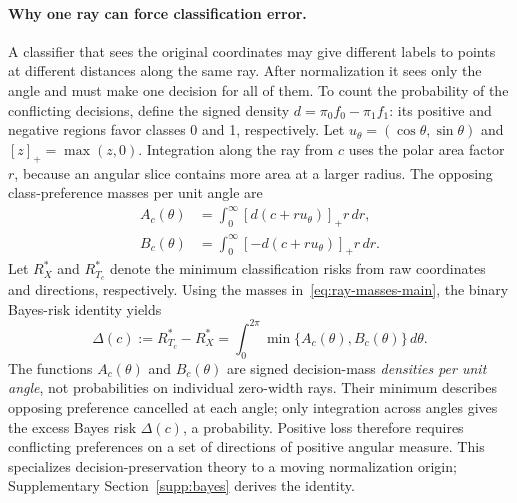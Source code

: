 \paragraph{Why one ray can force classification error.}
A classifier that sees the original coordinates may give different labels to points at different distances along the same ray. After normalization it sees only the angle and must make one decision for all of them. To count the probability of the conflicting decisions, define the signed density $d=\pi_0f_0-\pi_1f_1$: its positive and negative regions favor classes 0 and 1, respectively. Let $u_\theta=(\cos\theta,\sin\theta)$ and $[z]_+=\max(z,0)$. Integration along the ray from $c$ uses the polar area factor $r$, because an angular slice contains more area at a larger radius. The opposing class-preference masses per unit angle are
\begin{equation}
\begin{aligned}
 A_c(\theta)&=\int_0^\infty[d(c+ru_\theta)]_+r\,dr,\\
 B_c(\theta)&=\int_0^\infty[-d(c+ru_\theta)]_+r\,dr.
\end{aligned}
\label{eq:ray-masses-main}
\end{equation}
Let $R_X^*$ and $R^*_{T_c}$ denote the minimum classification risks from raw coordinates and directions, respectively. Using the masses in~\eqref{eq:ray-masses-main}, the binary Bayes-risk identity yields
\begin{equation}
 \Delta(c):=R^*_{T_c}-R_X^*
 =\int_0^{2\pi}\min\{A_c(\theta),B_c(\theta)\}\,d\theta.
 \label{eq:ray-loss-main}
\end{equation}
The functions $A_c(\theta)$ and $B_c(\theta)$ are signed decision-mass \emph{densities per unit angle}, not probabilities on individual zero-width rays. Their minimum describes opposing preference cancelled at each angle; only integration across angles gives the excess Bayes risk $\Delta(c)$, a probability. Positive loss therefore requires conflicting preferences on a set of directions of positive angular measure. This specializes decision-preservation theory \citep{Silva2012,Silva2024} to a moving normalization origin; Supplementary Section~\ref{supp:bayes} derives the identity.


